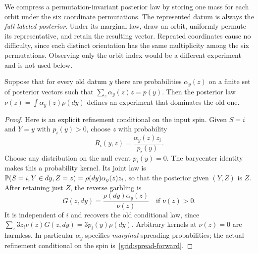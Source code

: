We compress a permutation-invariant posterior law by storing one mass for
each orbit under the six coordinate permutations.  The represented datum
is always the \emph{full labeled posterior}. Under its marginal law, draw
an orbit, uniformly permute its representative, and retain the resulting
vector. Repeated
coordinates cause no difficulty, since each distinct orientation has the
same multiplicity among the six permutations.  Observing only the orbit
index would be a different experiment and is not used below.

\begin{lemma}
\label{grid:spread}
Suppose that for every old datum $y$ there are probabilities
$\alpha_y(z)$ on a finite set of posterior vectors such that
$\sum_z\alpha_y(z)z=p(y)$.  Then the posterior law
$\nu(z)=\int\alpha_y(z)\rho(dy)$ defines an experiment that dominates the
old one.
\end{lemma}
\begin{proof}
Here is an explicit refinement conditional on the input spin.  Given
$S=i$ and $Y=y$ with $p_i(y)>0$, choose $z$ with probability
\begin{equation}
 R_i(y,z)=\frac{\alpha_y(z)z_i}{p_i(y)}.
 \label{grid:spread-forward}
\end{equation}
Choose any distribution on the null event $p_i(y)=0$.  The barycenter
identity makes this a probability kernel.  Its joint law is
$\mathbb P(S=i,Y\in dy,Z=z)=\rho(dy)\alpha_y(z)z_i$, so that the posterior
given $(Y,Z)$ is $Z$.  After retaining just $Z$, the reverse garbling is
\begin{equation}
 G(z,dy)=\frac{\rho(dy)\alpha_y(z)}{\nu(z)}\quad\text{if }\nu(z)>0.
 \label{grid:spread-reverse}
\end{equation}
It is independent of $i$ and recovers the old conditional law, since
$\sum_z3z_i\nu(z)G(z,dy)=3p_i(y)\rho(dy)$.  Arbitrary kernels at
$\nu(z)=0$ are harmless.  In particular $\alpha_y$ specifies
\emph{marginal} spreading probabilities; the actual refinement conditional
on the spin is~\eqref{grid:spread-forward}.
\end{proof}

